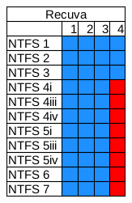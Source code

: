 \begin{figure}
\begin{subfigure}{0.16\linewidth}
        \includegraphics[width=\linewidth]{fig/recuva_results_ntfs.png}
    \end{subfigure}
    \begin{subfigure}{0.16\linewidth}

\end{subfigure}
\end{figure}
